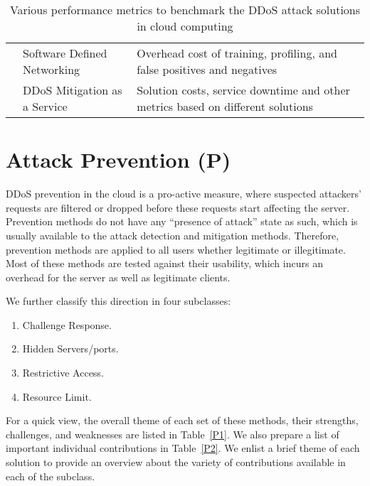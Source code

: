 \documentclass[final,5p,times,twocolumn]{elsarticle}
\begin{document}
\begin{table*}[t]
\begin{center}
{\begin{tabular}{|c|l|l|}
& Software Defined Networking & \small Overhead cost of training, profiling, and false positives and negatives  \\ \cline{2-3}
& DDoS Mitigation as a Service & \small Solution costs, service downtime and other metrics based on different solutions \\ \hline
\end{tabular}
}
\end{center}
\vspace{-2mm}
\caption{{Various performance metrics to benchmark the DDoS attack solutions in cloud computing}}
\label{metrics}
\vspace{-3mm}
\end{table*}


\section{Attack Prevention (P)}
\label{prevention}
DDoS prevention in the cloud is a pro-active measure, where suspected attackers' requests are filtered or dropped before these requests start affecting the server. Prevention methods do not have any ``presence of attack'' state as such, which is usually available to the attack detection and mitigation methods. Therefore, prevention methods are applied to all users whether legitimate or illegitimate. Most of these methods are tested against their usability, which incurs an overhead for the server as well as legitimate clients. {We further classify this direction in four subclasses:
\begin{enumerate}
\item Challenge Response.
\item Hidden Servers/ports.
\item Restrictive Access.
\item Resource Limit.
\end{enumerate} 
For a quick view, the overall theme of each set of these methods, their strengths, challenges, and weaknesses are listed in Table~\ref{P1}. We also prepare a list of important individual contributions in Table~\ref{P2}. We enlist a brief theme of each solution to provide an overview about the variety of contributions available in each of the subclass. }
\end{document}

